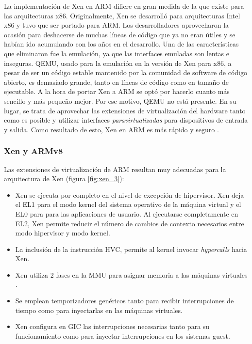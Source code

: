 La implementación de Xen en ARM difiere en gran medida de la que existe para las arquitecturas x86. Originalmente, Xen se desarrolló para arquitecturas Intel x86 y tuvo que ser portado para ARM. Los desarrolladores aprovecharon la ocasión para deshacerse de muchas líneas de código que ya no eran útiles y se habían ido acumulando con los años en el desarrollo. Una de las características que eliminaron fue la emulación, ya que las interfaces emuladas son lentas e inseguras. QEMU, usado para la emulación en la versión de Xen para x86, a pesar de ser un código estable mantenido por la comunidad de software de código abierto, es demasiado grande, tanto en líneas de código como en tamaño de ejecutable. A la hora de portar Xen a ARM se optó por hacerlo cuanto más sencillo y más pequeño mejor. Por ese motivo, QEMU no está presente. En su lugar, se trata de aprovechar las extensiones de virtualización del hardware tanto como es posible y utilizar interfaces \textit{paravirtualizadas} para dispositivos de entrada y salida. Como resultado de esto, Xen en ARM es más rápido y seguro \cite{xen_arm_whitepaper}.

\subsubsection{Xen y ARMv8}

Las extensiones de virtualización de ARM resultan muy adecuadas para la arquitectura de Xen (figura \ref{fig:xen_3}):
\begin{itemize}
  \item Xen se ejecuta por completo en el nivel de excepción de hipervisor. Xen deja el EL1 para el modo kernel del sistema operativo de la máquina virtual y el EL0 para para las aplicaciones de usuario. Al ejecutarse completamente en EL2, Xen permite reducir el número de cambios de contexto necesarios entre modo hipervisor y modo kernel.
  \item La inclusión de la instrucción HVC, permite al kernel invocar \textit{hypercalls} hacia Xen.
  \item Xen utiliza 2 fases en la \acrshort{MMU} para asignar memoria a las máquinas virtuales \cite{armv8_virt_mmu}.
  \item Se emplean temporizadores genéricos tanto para recibir interrupciones de tiempo como para inyectarlas en las máquinas virtuales.
  \item Xen configura en \acrshort{GIC} las interrupciones necesarias tanto para su funcionamiento como para inyectar interrupciones en los sistemas guest.
\end{itemize}

